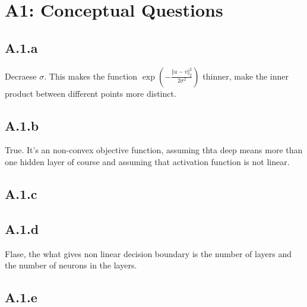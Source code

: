 \documentclass[]{article}
\begin{document}
\section*{A1: Conceptual Questions}
    \subsection*{A.1.a}
        Decraese $\sigma$. This makes the function $\exp\left(
            - \frac{\Vert u - v\Vert_2^2}{2\sigma^2} 
        \right)$ thinner, make the inner product between different points more distinct. 
    \subsection*{A.1.b}
        True. It's an non-convex objective function, assuming thta deep means more than one hidden layer of course and assuming that activation function is not linear. 
    \subsection*{A.1.c}
        
    \subsection*{A.1.d}
        Flase, the what gives non linear decision boundary is the number of layers and the number of neurons in the layers. 
    \subsection*{A.1.e}
\end{document}
